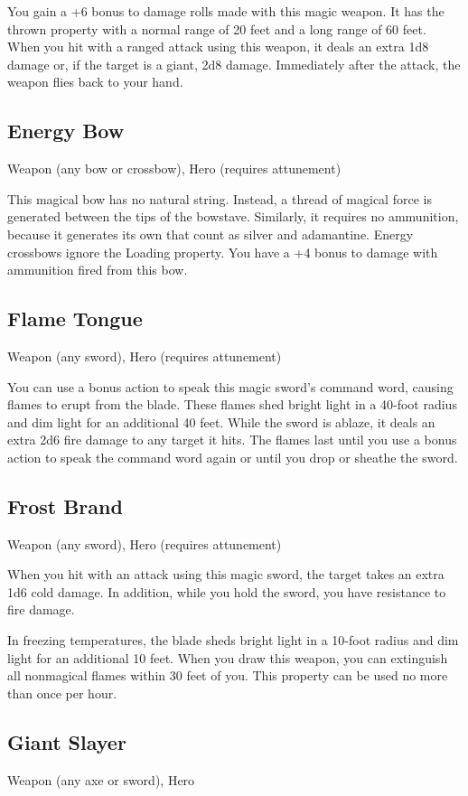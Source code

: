 You gain a +6 bonus to damage rolls made with this magic weapon. It has the thrown property with a normal range of 20 feet and a long range of 60 feet. When you hit with a ranged attack using this weapon, it deals an extra 1d8 damage or, if the target is a giant, 2d8 damage. Immediately after the attack, the weapon flies back to your hand.

\subsection{Energy Bow}
Weapon (any bow or crossbow), Hero (requires attunement)

This magical bow has no natural string. Instead, a thread of magical force is generated between the tips of the bowstave. Similarly, it requires no ammunition, because it generates its own that count as silver and adamantine. Energy crossbows ignore the Loading property. You have a +4 bonus to damage with ammunition fired from this bow.

\subsection{Flame Tongue}
Weapon (any sword), Hero (requires attunement) 

You can use a bonus action to speak this magic sword's command word, causing flames to erupt from the blade. These flames shed bright light in a 40-foot radius and dim light for an additional 40 feet. While the sword is ablaze, it deals an extra 2d6 fire damage to any target it hits. The flames last until you use a bonus action to speak the command word again or until you drop or sheathe the sword.

\subsection{Frost Brand}
Weapon (any sword), Hero (requires attunement) 

When you hit with an attack using this magic sword, the target takes an extra 1d6 cold damage. In addition, while you hold the sword, you have resistance to fire damage.

In freezing temperatures, the blade sheds bright light in a 10-foot radius and dim light for an additional 10 feet. When you draw this weapon, you can extinguish all nonmagical flames within 30 feet of you. This property can be used no more than once per hour.

\subsection{Giant Slayer}
Weapon (any axe or sword), Hero 

